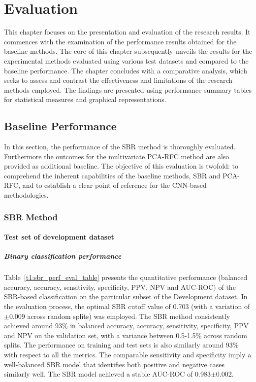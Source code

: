 \section{Evaluation}
\label{sec:evaluation}

This chapter focuses on the presentation and evaluation of the research results.
It commences with the examination of the performance results obtained for the baseline methods.
The core of this chapter subsequently unveils the results 
for the experimental methods evaluated using various test datasets and compared to the baseline performance.
The chapter concludes with a comparative analysis, which seeks to assess and contrast the effectiveness and 
limitations of the research methods employed.
The findings are presented using performance summary tables for statistical measures and graphical representations.

\subsection{Baseline Performance}
\label{subsec:baseline_performance}

In this section, the performance of the SBR method is thoroughly evaluated. 
Furthermore the outcomes for the multivariate PCA-RFC method are also provided as additional baseline.
The objective of this evaluation is twofold: to comprehend the inherent capabilities of the baseline methods, SBR and
PCA-RFC, and to establish a clear point of reference for the CNN-based methodologies.

\subsubsection{SBR Method}
\label{subsubsec:eval_sbr}


\paragraph{Test set of development dataset}

\subparagraph{Binary classification performance}

Table~\ref{t1:sbr_perf_eval_table} presents the quantitative performance 
(balanced accuracy, accuracy, sensitivity, specificity, PPV, NPV and AUC-ROC) of the SBR-based classification on the 
particular subset of the Development dataset.
In the evaluation process, the optimal SBR cutoff value of 0.703 (with a variation of $\pm$0.009 across random splits) 
was employed.
The SBR method consistently achieved around 93\% in balanced accuracy, accuracy, sensitivity, specificity, PPV and NPV 
on the validation set, with a variance between 0.5-1.5\% across random splits.
The performance on training and test sets is also similarly around 93\% with respect to all the metrics.
The comparable sensitivity and specificity imply a well-balanced SBR model that 
identifies both positive and negative cases similarly well.
The SBR model achieved a stable AUC-ROC of 0.983$\pm$0.002.


